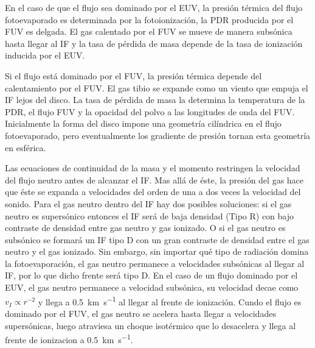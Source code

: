 En el caso de que el flujo sea dominado por el EUV, la presión térmica del flujo fotoevaporado es determinada por la fotoionización, la PDR producida por el FUV es delgada. El gas calentado por el FUV se mueve de manera subsónica hasta llegar al IF y la tasa de pérdida de masa depende de la tasa de ionización inducida por el EUV.

Si el flujo está dominado por el FUV, la presión térmica depende del calentamiento por el FUV. El gas tibio se expande como un viento que empuja el IF lejos del disco. La tasa de pérdida de masa la determina la temperatura de la PDR, el flujo FUV y la opacidad del polvo a las longitudes de onda del FUV. Inicialmente la forma del disco impone una geometría cilíndrica en el flujo fotoevaporado, pero eventualmente los gradiente de presión tornan esta geometría en esférica.

Las ecuaciones de continuidad de la masa y el momento restringen la velocidad del flujo neutro antes de alcanzar el IF. Mas allá de éste, la presión del gas hace que éste se expanda a velocidades del orden de una a dos veces la velocidad del sonido. Para el gas neutro dentro del IF hay dos posibles soluciones: si el gas neutro es supersónico entonces el IF será de baja densidad (Tipo R) con bajo contraste de densidad entre gas neutro y gas ionizado. O si el gas neutro es subsónico se formará un IF tipo D con un gran contraste de densidad entre el gas neutro y el gas ionizado. Sin embargo, sin importar qué tipo de radiación domina la fotoevaporación, el gas neutro permanece a velocidades subsónicas al llegar al IF, por lo que dicho frente será tipo D. En el caso de un flujo dominado por el EUV, el gas neutro permanece a velocidad subsónica, su velocidad decae como $v_I \propto r^{-2}$ y llega a \SI{0.5}{km.s^{-1}} al llegar al frente de ionización. Cundo el flujo es dominado por el FUV, el gas neutro se acelera hasta llegar a velocidades supersónicas, luego atraviesa un choque isotérmico que lo desacelera y llega al frente de ionizacion a \SI{0.5}{km.s^{-1}}.

